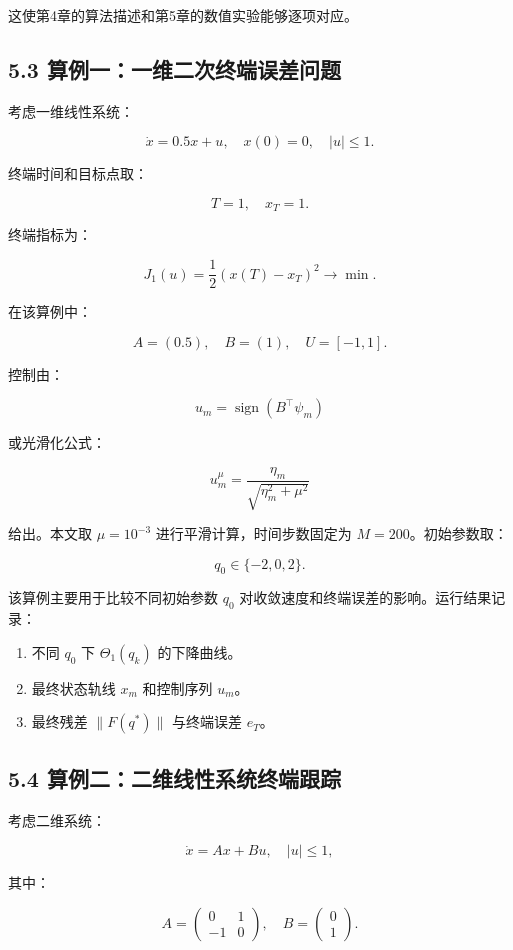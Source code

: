 \documentclass[UTF8,a4paper,zihao=-4]{ctexart}
\begin{document}
这使第4章的算法描述和第5章的数值实验能够逐项对应。

\subsection{5.3 算例一：一维二次终端误差问题}

考虑一维线性系统：

\[
\dot{x}=0.5x+u,\quad x(0)=0,\quad |u|\leq 1.
\]

终端时间和目标点取：

\[
T=1,\quad x_T=1.
\]

终端指标为：

\[
J_1(u)=\frac{1}{2}(x(T)-x_T)^2\to\min.
\]

在该算例中：

\[
A=(0.5),\quad B=(1),\quad U=[-1,1].
\]

控制由：

\[
u_m=\operatorname{sign}(B^\top\psi_m)
\]

或光滑化公式：

\[
u_m^\mu=\frac{\eta_m}{\sqrt{\eta_m^2+\mu^2}}
\]

给出。本文取 $\mu=10^{-3}$ 进行平滑计算，时间步数固定为 $M=200$。初始参数取：

\[
q_0\in\{-2,0,2\}.
\]

该算例主要用于比较不同初始参数 $q_0$ 对收敛速度和终端误差的影响。运行结果记录：

\begin{enumerate}
\item 不同 $q_0$ 下 $\Theta_1(q_k)$ 的下降曲线。
\item 最终状态轨线 $x_m$ 和控制序列 $u_m$。
\item 最终残差 $\|F(q^*)\|$ 与终端误差 $e_T$。
\end{enumerate}

\subsection{5.4 算例二：二维线性系统终端跟踪}

考虑二维系统：

\[
\dot{x}=Ax+Bu,\quad |u|\leq 1,
\]

其中：

\[
A=
\begin{pmatrix}
0&1\\
-1&0
\end{pmatrix},
\quad
B=
\begin{pmatrix}
0\\
1
\end{pmatrix}.
\]
\end{document}
